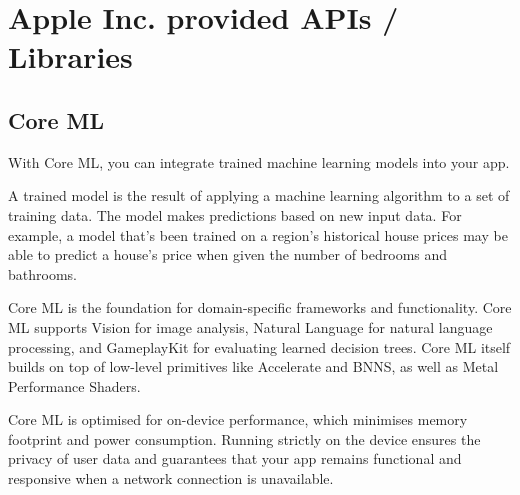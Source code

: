 \documentclass[14pt,a4paper]{article}
\begin{document}
\newpage
\section{Apple Inc. provided APIs / Libraries}
\subsection{Core ML}
\par With Core ML, you can integrate trained machine learning models into your app.
\par A trained model is the result of applying a machine learning algorithm to a set of training data. The model makes predictions based on new input data. For example, a model that's been trained on a region's historical house prices may be able to predict a house's price when given the number of bedrooms and bathrooms.
\par Core ML is the foundation for domain-specific frameworks and functionality. Core ML supports Vision for image analysis, Natural Language for natural language processing, and GameplayKit for evaluating learned decision trees. Core ML itself builds on top of low-level primitives like Accelerate and BNNS, as well as Metal Performance Shaders.
\par Core ML is optimised for on-device performance, which minimises memory footprint and power consumption. Running strictly on the device ensures the privacy of user data and guarantees that your app remains functional and responsive when a network connection is unavailable.
\end{document}
